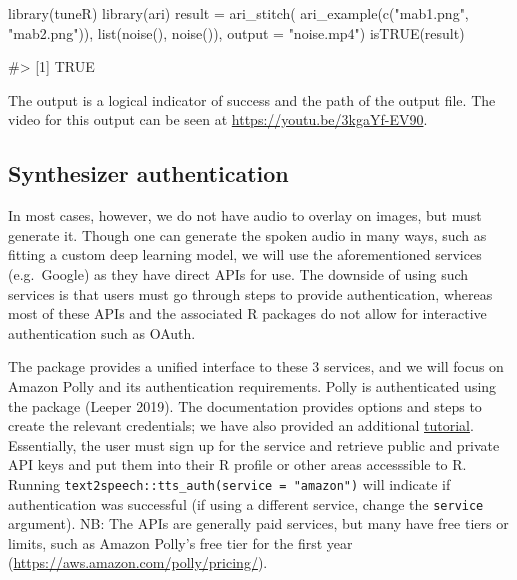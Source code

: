\begin{Schunk}
\begin{Sinput}
library(tuneR)
library(ari)
result = ari_stitch(
  ari_example(c("mab1.png", "mab2.png")),
  list(noise(), noise()),
  output = "noise.mp4")
isTRUE(result)
\end{Sinput}
\begin{Soutput}
#> [1] TRUE
\end{Soutput}
\end{Schunk}

The output is a logical indicator of success and the path of the output
file. The video for this output can be seen at
\url{https://youtu.be/3kgaYf-EV90}.

\hypertarget{synthesizer-authentication}{%
\subsection{Synthesizer
authentication}\label{synthesizer-authentication}}

In most cases, however, we do not have audio to overlay on images, but
must generate it. Though one can generate the spoken audio in many ways,
such as fitting a custom deep learning model, we will use the
aforementioned services (e.g.~Google) as they have direct APIs for use.
The downside of using such services is that users must go through steps
to provide authentication, whereas most of these APIs and the associated
R packages do not allow for interactive authentication such as OAuth.

The  package provides a unified interface to these 3
services, and we will focus on Amazon Polly and its authentication
requirements. Polly is authenticated using the 
package (Leeper 2019). The  documentation provides
options and steps to create the relevant credentials; we have also
provided an additional
\href{http://seankross.com/2017/05/02/Access-Amazon-Web-Services-in-R.html}{tutorial}.
Essentially, the user must sign up for the service and retrieve public
and private API keys and put them into their R profile or other areas
accesssible to R. Running
\texttt{text2speech::tts\_auth(service\ =\ "amazon")} will indicate if
authentication was successful (if using a different service, change the
\texttt{service} argument). NB: The APIs are generally paid services,
but many have free tiers or limits, such as Amazon Polly's free tier for
the first year (\url{https://aws.amazon.com/polly/pricing/}).

